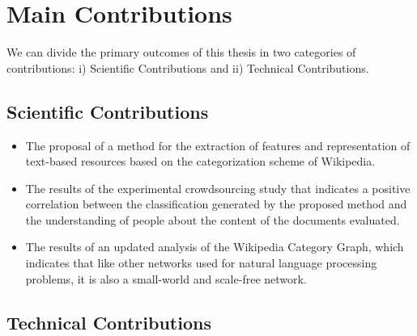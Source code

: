 \section{\hspace*{3pt}Main Contributions}

We can divide the primary outcomes of this thesis in two categories of contributions: i) Scientific Contributions and ii) Technical Contributions.

\subsection{\hspace*{3pt}Scientific Contributions}


\begin{itemize}
\item The proposal of a method for the extraction of features and representation of text-based resources based on the categorization scheme of Wikipedia.

\item The results of the experimental crowdsourcing study that indicates a positive correlation between the classification generated by the proposed method and the understanding of people about the content of the documents evaluated.

\item The results of an updated analysis of the Wikipedia Category Graph, which indicates that like other networks used for natural language processing problems, it is also a small-world and scale-free network.


\end{itemize}


\subsection{\hspace*{3pt}Technical Contributions}

